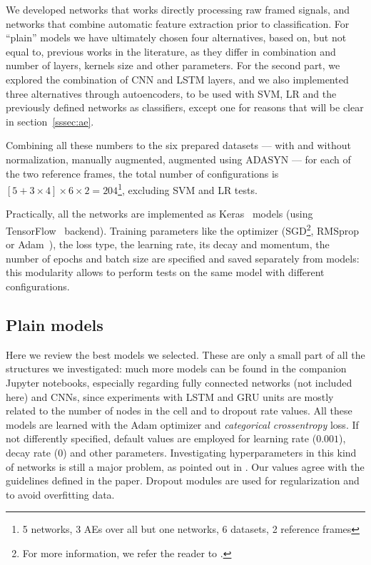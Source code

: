 We developed networks that works directly processing raw framed signals, and networks that combine automatic feature extraction prior to classification.
For ``plain'' models we have ultimately chosen four alternatives, based on, but not equal to, previous works in the literature, as they differ in combination and number of layers, kernels size and other parameters.
%
For the second part, we explored the combination of CNN and LSTM layers, and we also implemented three alternatives through autoencoders, to be used with SVM, LR and the previously defined networks as classifiers, except one for reasons that will be clear in section~\ref{sssec:ae}.

Combining all these numbers to the six prepared datasets --- with and without normalization, manually augmented, augmented using ADASYN --- for each of the two reference frames, the total number of configurations is $[5+3\times4]\times6\times2=204$\footnote{5 networks, 3 AEs over all but one networks, 6 datasets, 2 reference frames}, excluding SVM and LR tests.

Practically, all the networks are implemented as Keras~\cite{keras2015} models (using TensorFlow~\cite{tensorflow2015} backend).
Training parameters like the optimizer (SGD\footnote{For more information, we refer the reader to \cite{Ruder-SGDoverview}.}, RMSprop~\cite{Graves-RMSprop} or Adam~\cite{Kingma-Adam}), the loss type, the learning rate, its decay and momentum, the number of epochs and batch size are specified and saved separately from models: this modularity allows to perform tests on the same model with different configurations.

\subsection{Plain models}\label{ssec:plain_models}

Here we review the best models we selected.
These are only a small part of all the structures we investigated: much more models can be found in the companion Jupyter notebooks, especially regarding fully connected networks (not included here) and CNNs, since experiments with LSTM and GRU units are mostly related to the number of nodes in the cell and to dropout rate values.
All these models are learned with the Adam optimizer and \textit{categorical crossentropy} loss.
If not differently specified, default values are employed for learning rate ($0.001$), decay rate ($0$) and other parameters.
Investigating hyperparameters in this kind of networks is still a major problem, as pointed out in \cite{Hammerla-DeepConvRec}.
Our values agree with the guidelines defined in the paper.
Dropout modules are used for regularization and to avoid overfitting data.

